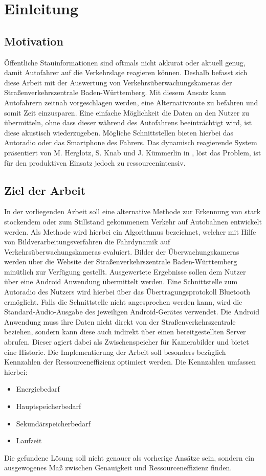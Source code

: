 \chapter{Einleitung}
\label{cha:Einleitung}

\section{Motivation}
\label{sec:Motivation}
Öffentliche Stauinformationen sind oftmals nicht akkurat oder aktuell genug, damit Autofahrer auf die Verkehrslage reagieren können. Deshalb befasst sich diese Arbeit mit der Auswertung von Verkehrsüberwachungskameras der Straßenverkehrszentrale Baden-Württemberg.
Mit diesem Ansatz kann Autofahrern zeitnah vorgeschlagen werden, eine Alternativroute zu befahren und somit Zeit einzusparen.
Eine einfache Möglichkeit die Daten an den Nutzer zu übermitteln, ohne dass dieser während des Autofahrens beeinträchtigt wird, ist diese akustisch wiederzugeben.
Mögliche Schnittstellen bieten hierbei das Autoradio oder das Smartphone des Fahrers.
Das dynamisch reagierende System präsentiert von M. Herglotz, S. Knab und J. Kümmerlin in \cite{hkkDhbw}, löst das Problem, ist für den produktiven Einsatz jedoch zu ressourcenintensiv.

\section{Ziel der Arbeit}
\label{sec:ZielDerArbeit}
In der vorliegenden Arbeit soll eine alternative Methode zur Erkennung von stark stockendem oder zum Stillstand gekommenem Verkehr auf Autobahnen entwickelt werden. 
Als Methode wird hierbei ein Algorithmus bezeichnet, welcher mit Hilfe von Bildverarbeitungsverfahren die Fahrdynamik auf Verkehrsüberwachungskameras evaluiert.
Bilder der Überwachungskameras werden über die Website der Straßenverkehrszentrale Baden-Württemberg minütlich zur Verfügung gestellt. 
Ausgewertete Ergebnisse sollen dem Nutzer über eine Android Anwendung übermittelt werden. Eine Schnittstelle zum Autoradio des Nutzers wird hierbei über das Übertragungsprotokoll Bluetooth ermöglicht. Falls die Schnittstelle nicht angesprochen werden kann, wird die Standard-Audio-Ausgabe des jeweiligen Android-Gerätes verwendet.
Die Android Anwendung muss ihre Daten nicht direkt von der Straßenverkehrszentrale beziehen, sondern kann diese auch indirekt über einen bereitgestellten Server abrufen.
Dieser agiert dabei als Zwischenspeicher für Kamerabilder und bietet eine Historie.
Die Implementierung der Arbeit soll besonders bezüglich Kennzahlen der Ressourceneffizienz optimiert werden.
Die Kennzahlen umfassen hierbei:
\begin{itemize}
\item{Energiebedarf}
\item{Hauptspeicherbedarf}
\item{Sekundärspeicherbedarf}
\item{Laufzeit}
\end{itemize}
Die gefundene Lösung soll nicht genauer als vorherige Ansätze sein, sondern ein ausgewogenes Maß zwischen Genauigkeit und Ressourceneffizienz finden.
